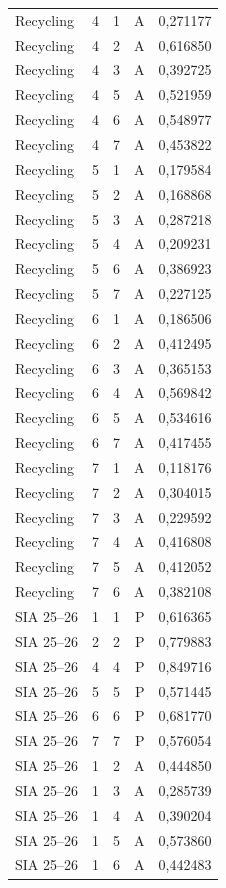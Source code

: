 \begin{longtable}{lrrrr}
Recycling & 4 & 1 & A & 0,271177 \\
Recycling & 4 & 2 & A & 0,616850 \\
Recycling & 4 & 3 & A & 0,392725 \\
Recycling & 4 & 5 & A & 0,521959 \\
Recycling & 4 & 6 & A & 0,548977 \\
Recycling & 4 & 7 & A & 0,453822 \\
Recycling & 5 & 1 & A & 0,179584 \\
Recycling & 5 & 2 & A & 0,168868 \\
Recycling & 5 & 3 & A & 0,287218 \\
Recycling & 5 & 4 & A & 0,209231 \\
Recycling & 5 & 6 & A & 0,386923 \\
Recycling & 5 & 7 & A & 0,227125 \\
Recycling & 6 & 1 & A & 0,186506 \\
Recycling & 6 & 2 & A & 0,412495 \\
Recycling & 6 & 3 & A & 0,365153 \\
Recycling & 6 & 4 & A & 0,569842 \\
Recycling & 6 & 5 & A & 0,534616 \\
Recycling & 6 & 7 & A & 0,417455 \\
Recycling & 7 & 1 & A & 0,118176 \\
Recycling & 7 & 2 & A & 0,304015 \\
Recycling & 7 & 3 & A & 0,229592 \\
Recycling & 7 & 4 & A & 0,416808 \\
Recycling & 7 & 5 & A & 0,412052 \\
Recycling & 7 & 6 & A & 0,382108 \\
SIA 25--26 & 1 & 1 & P & 0,616365 \\
SIA 25--26 & 2 & 2 & P & 0,779883 \\
SIA 25--26 & 4 & 4 & P & 0,849716 \\
SIA 25--26 & 5 & 5 & P & 0,571445 \\
SIA 25--26 & 6 & 6 & P & 0,681770 \\
SIA 25--26 & 7 & 7 & P & 0,576054 \\
SIA 25--26 & 1 & 2 & A & 0,444850 \\
SIA 25--26 & 1 & 3 & A & 0,285739 \\
SIA 25--26 & 1 & 4 & A & 0,390204 \\
SIA 25--26 & 1 & 5 & A & 0,573860 \\
SIA 25--26 & 1 & 6 & A & 0,442483 \\

\end{longtable}

